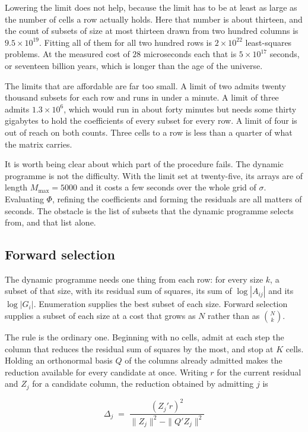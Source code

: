 Lowering the limit does not help, because the limit has to be at least as large as
the number of cells a row actually holds. Here that number is about thirteen, and
the count of subsets of size at most thirteen drawn from two hundred columns is
$9.5 \times 10^{19}$. Fitting all of them for all two hundred rows is
$2 \times 10^{22}$ least-squares problems. At the measured cost of $28$
microseconds each that is $5 \times 10^{17}$ seconds, or seventeen billion
years, which is longer than the age of the universe.

The limits that are affordable are far too small. A limit of two admits twenty
thousand subsets for each row and runs in under a minute. A limit of three admits
$1.3 \times 10^{6}$, which would run in about forty minutes but needs some thirty
gigabytes to hold the coefficients of every subset for every row. A limit of four is
out of reach on both counts. Three cells to a row is less than a quarter of what the
matrix carries.

It is worth being clear about which part of the procedure fails. The dynamic
programme is not the difficulty. With the limit set at twenty-five, its arrays are
of length $M_{\max} = 5000$ and it costs a few seconds over the whole grid of
$\sigma$. Evaluating $\Phi$, refining the coefficients and forming the residuals are
all matters of seconds. The obstacle is the list of subsets that the dynamic
programme selects from, and that list alone.

\subsection{Forward selection}

The dynamic programme needs one thing from each row: for every size $k$, a subset of
that size, with its residual sum of squares, its sum of $\log |A_{ij}|$ and its
$\log |G_{i}|$. Enumeration supplies the best subset of each size. Forward selection
supplies a subset of each size at a cost that grows as $N$ rather than as
$\binom{N}{k}$.

The rule is the ordinary one. Beginning with no cells, admit at each step the column
that reduces the residual sum of squares by the most, and stop at $K$ cells. Holding
an orthonormal basis $Q$ of the columns already admitted makes the reduction
available for every candidate at once. Writing $r$ for the current residual and
$Z_{j}$ for a candidate column, the reduction obtained by admitting $j$ is

\begin{equation}
\Delta_{j} \;=\; \frac{( Z_{j}' r )^{2}}
                      {\| Z_{j} \|^{2} - \| Q' Z_{j} \|^{2}}
\label{eq:forward}
\end{equation}

